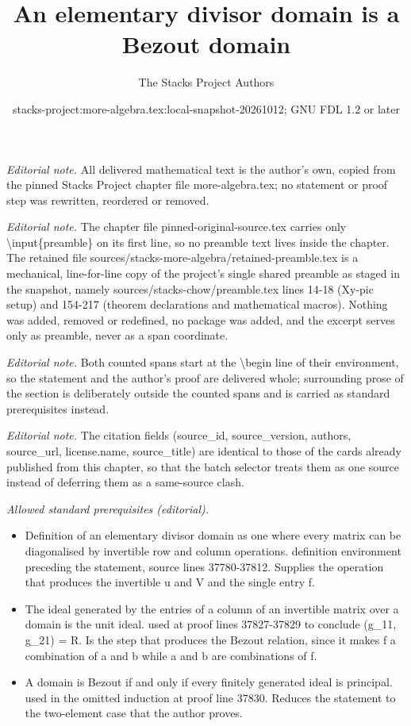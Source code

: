 \documentclass[10pt,a4paper]{amsart}
\title{An elementary divisor domain is a Bezout domain}
\author{The Stacks Project Authors}
\date{stacks-project:more-algebra.tex:local-snapshot-20261012; GNU FDL 1.2 or later}
\theoremstyle{plain}
\theoremstyle{definition}
\theoremstyle{remark}
\numberwithin{equation}{subsection}
\begin{document}
\maketitle
\setcounter{subsection}{1}
\noindent\textit{Editorial note.} All delivered mathematical text is the author's own, copied from the pinned Stacks Project chapter file more-algebra.tex; no statement or proof step was rewritten, reordered or removed.\par\medskip
\noindent\textit{Editorial note.} The chapter file pinned-original-source.tex carries only \textbackslash{}input\{preamble\} on its first line, so no preamble text lives inside the chapter. The retained file sources/stacks-more-algebra/retained-preamble.tex is a mechanical, line-for-line copy of the project's single shared preamble as staged in the snapshot, namely sources/stacks-chow/preamble.tex lines 14-18 (Xy-pic setup) and 154-217 (theorem declarations and mathematical macros). Nothing was added, removed or redefined, no package was added, and the excerpt serves only as preamble, never as a span coordinate.\par\medskip
\noindent\textit{Editorial note.} Both counted spans start at the \textbackslash{}begin line of their environment, so the statement and the author's proof are delivered whole; surrounding prose of the section is deliberately outside the counted spans and is carried as standard prerequisites instead.\par\medskip
\noindent\textit{Editorial note.} The citation fields (source\_id, source\_version, authors, source\_url, license.name, source\_title) are identical to those of the cards already published from this chapter, so that the batch selector treats them as one source instead of deferring them as a same-source clash.\par\medskip
\noindent\textit{Allowed standard prerequisites (editorial).}\begin{itemize}
\item Definition of an elementary divisor domain as one where every matrix can be diagonalised by invertible row and column operations. definition environment preceding the statement, source lines 37780-37812. Supplies the operation that produces the invertible u and V and the single entry f.
\item The ideal generated by the entries of a column of an invertible matrix over a domain is the unit ideal. used at proof lines 37827-37829 to conclude (g\_11, g\_21) = R. Is the step that produces the Bezout relation, since it makes f a combination of a and b while a and b are combinations of f.
\item A domain is Bezout if and only if every finitely generated ideal is principal. used in the omitted induction at proof line 37830. Reduces the statement to the two-element case that the author proves.
\end{itemize}\medskip
\end{document}
